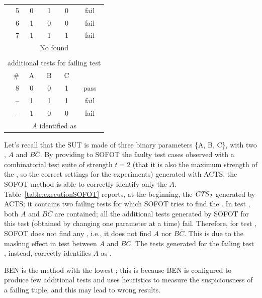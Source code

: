 \begin{tikzborder}{\cite{Gargantini16:validation}}
\begin{tikzborder}{\cite{gargantini_combinatorial_2017}}
\begin{tikzborder}{\cite{garn2019}}
\begin{tikzborder}{\cite{arcaini2019achieving}}
\begin{tikzborder}{}
\begin{table}[!htb]
\begin{tabular}{r|c|c|c||c}
		\hline
		5& 0 & 1 & 0 & \textsf{fail} \\
		6& 1 & 0 & 0 & \textsf{fail} \\
		7& 1 & 1 & 1 & \textsf{fail} \\
		\multicolumn{5}{c}{No \mfic found}\\ 
		\hline
		\multicolumn{5}{c}{} \\
		\hline
		\multicolumn{5}{c}{additional tests for failing test \ding{173}}\\
		\midrule
		\# & A & B & C & \result \\
		\hline
		8& 0 & 0 & 1 & \textsf{pass} \\
		--& 1 & 1 & 1 & \textsf{fail} \\
		--& 1 & 0 & 0 & \textsf{fail} \\
		\multicolumn{5}{c}{$A$ identified as \mfic}\\ 
		\bottomrule
	\end{tabular}
\end{table}
%
Let's recall that the SUT is made of three binary parameters \{A, B, C\}, with two \truemfics, $A$ and $B\bar{C}$. By providing to SOFOT the faulty test cases observed with a combinatorial test suite of strength $t=2$ (that it is also the maximum strength of the \truemfics, so the correct settings for the experiments) generated with ACTS, the SOFOT method is able to correctly identify only the \mfic $A$. Table~\ref{table:executionSOFOT} reports, at the beginning, the $\mathit{CTS}_2$ generated by ACTS; it contains two failing tests for which SOFOT tries to find the \mfic.
In test , both \truemfics $A$ and $B\bar{C}$ are contained; all the additional tests generated by SOFOT for this test (obtained by changing one parameter at a time) fail. Therefore, for test , SOFOT does not find any \mfic, i.e., it does not find $A$ nor $B\bar{C}$. This is due to the masking effect in test  between $A$ and $B\bar{C}$. The tests generated for the failing test , instead, correctly identifies $A$ as \mfic.

BEN is the method with the lowest \fScore; this is because BEN is configured to produce few additional tests and uses heuristics to measure the suspiciousness of a failing tuple, and this may lead to wrong results.



\end{tikzborder}
\end{tikzborder}
\end{tikzborder}
\end{tikzborder}
\end{tikzborder}
